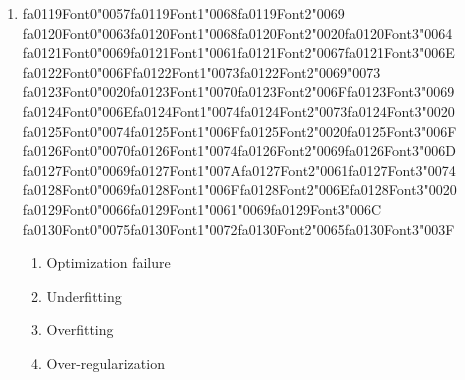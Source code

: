 \documentclass[12pt]{article}
\begin{document}
\begin{enumerate}[label=Q\arabic*.]
 \begin{enumerate}[label=(\Alph*)]
     \item Bag-of-Words representation assumes term independence
     \item IDF overweights rare tokens
     \item Document length normalization distorts similarity
     \item Cosine similarity ignores magnitude differences
 \end{enumerate}
 
 \item {\csname fa0119Font0\endcsname\char"0057}{\csname fa0119Font1\endcsname\char"0068}{\csname fa0119Font2\endcsname\char"0069} {\csname fa0120Font0\endcsname\char"0063}{\csname fa0120Font1\endcsname\char"0068}{\csname fa0120Font2\endcsname\char"0020}{\csname fa0120Font3\endcsname\char"0064} {\csname fa0121Font0\endcsname\char"0069}{\csname fa0121Font1\endcsname\char"0061}{\csname fa0121Font2\endcsname\char"0067}{\csname fa0121Font3\endcsname\char"006E} {\csname fa0122Font0\endcsname\char"006F}{\csname fa0122Font1\endcsname\char"0073}{\csname fa0122Font2\endcsname\char"0069}{\char"0073} {\csname fa0123Font0\endcsname\char"0020}{\csname fa0123Font1\endcsname\char"0070}{\csname fa0123Font2\endcsname\char"006F}{\csname fa0123Font3\endcsname\char"0069} {\csname fa0124Font0\endcsname\char"006E}{\csname fa0124Font1\endcsname\char"0074}{\csname fa0124Font2\endcsname\char"0073}{\csname fa0124Font3\endcsname\char"0020} {\csname fa0125Font0\endcsname\char"0074}{\csname fa0125Font1\endcsname\char"006F}{\csname fa0125Font2\endcsname\char"0020}{\csname fa0125Font3\endcsname\char"006F} {\csname fa0126Font0\endcsname\char"0070}{\csname fa0126Font1\endcsname\char"0074}{\csname fa0126Font2\endcsname\char"0069}{\csname fa0126Font3\endcsname\char"006D} {\csname fa0127Font0\endcsname\char"0069}{\csname fa0127Font1\endcsname\char"007A}{\csname fa0127Font2\endcsname\char"0061}{\csname fa0127Font3\endcsname\char"0074} {\csname fa0128Font0\endcsname\char"0069}{\csname fa0128Font1\endcsname\char"006F}{\csname fa0128Font2\endcsname\char"006E}{\csname fa0128Font3\endcsname\char"0020} {\csname fa0129Font0\endcsname\char"0066}{\csname fa0129Font1\endcsname\char"0061}{\char"0069}{\csname fa0129Font3\endcsname\char"006C} {\csname fa0130Font0\endcsname\char"0075}{\csname fa0130Font1\endcsname\char"0072}{\csname fa0130Font2\endcsname\char"0065}{\csname fa0130Font3\endcsname\char"003F}
 \begin{enumerate}[label=(\Alph*)]
     \item Optimization failure
     \item Underfitting
     \item Overfitting
     \item Over-regularization
 \end{enumerate}
 

\end{enumerate}
\end{document}
